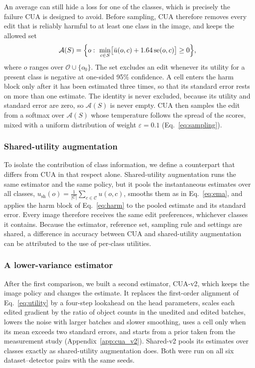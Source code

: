 \documentclass[conference]{IEEEtran}
\begin{document}
An average can still hide a loss for one of the classes, which is precisely the failure CUA is designed to avoid. Before sampling, CUA therefore removes every edit that is reliably harmful to at least one class in the image, and keeps the allowed set
\begin{equation}
\mathcal{A}(S)=\Bigl\{o:\ \min_{c\in S}\bigl[\bar u(o,c)+1.64\,\mathrm{se}(o,c)\bigr]\geq 0\Bigr\},
\label{eq:harm}
\end{equation}
where $o$ ranges over $\mathcal{O}\cup\{o_0\}$. The set excludes an edit whenever its utility for a present class is negative at one-sided 95\% confidence. A cell enters the harm block only after it has been estimated three times, so that its standard error rests on more than one estimate. The identity is never excluded, because its utility and standard error are zero, so $\mathcal{A}(S)$ is never empty. CUA then samples the edit from a softmax over $\mathcal{A}(S)$ whose temperature follows the spread of the scores, mixed with a uniform distribution of weight $\varepsilon=0.1$ (Eq.~\eqref{eq:sampling}).

\subsubsection{Shared-utility augmentation}
\label{sec:method_shared}

To isolate the contribution of class information, we define a counterpart that differs from CUA in that respect alone. Shared-utility augmentation runs the same estimator and the same policy, but it pools the instantaneous estimates over all classes, $u_{\mathrm{sh}}(o)=\frac{1}{|\mathcal{C}|}\sum_{c\in\mathcal{C}}u(o,c)$, smooths them as in Eq.~\eqref{eq:ema}, and applies the harm block of Eq.~\eqref{eq:harm} to the pooled estimate and its standard error. Every image therefore receives the same edit preferences, whichever classes it contains. Because the estimator, reference set, sampling rule and settings are shared, a difference in accuracy between CUA and shared-utility augmentation can be attributed to the use of per-class utilities.

\subsubsection{A lower-variance estimator}
\label{sec:method_v2}

After the first comparison, we built a second estimator, CUA-v2, which keeps the image policy and changes the estimate. It replaces the first-order alignment of Eq.~\eqref{eq:utility} by a four-step lookahead on the head parameters, scales each edited gradient by the ratio of object counts in the unedited and edited batches, lowers the noise with larger batches and slower smoothing, uses a cell only when its mean exceeds two standard errors, and starts from a prior taken from the measurement study (Appendix~\ref{app:cua_v2}). Shared-v2 pools its estimates over classes exactly as shared-utility augmentation does. Both were run on all six dataset--detector pairs with the same seeds.
\end{document}
